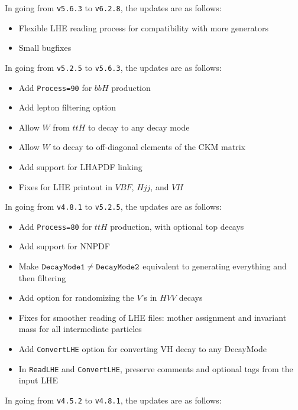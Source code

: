 \documentclass[aps,superscriptaddress,nofootinbib]{revtex4}
\begin{document}
\noindent
In going from \verb|v5.6.3| to \verb|v6.2.8|, the updates are as follows:

\begin{itemize}
\item Flexible LHE reading process for compatibility with more generators
\item Small bugfixes
\end{itemize}

\noindent
In going from \verb|v5.2.5| to \verb|v5.6.3|, the updates are as follows:

\begin{itemize}
\item Add \verb|Process=90| for $bbH$ production
\item Add lepton filtering option
\item Allow $W$ from $ttH$ to decay to any decay mode
\item Allow $W$ to decay to off-diagonal elements of the CKM matrix
\item Add support for LHAPDF linking
\item Fixes for LHE printout in $VBF$, $Hjj$, and $VH$
\end{itemize}

\noindent
In going from \verb|v4.8.1| to \verb|v5.2.5|, the updates are as follows:

\begin{itemize}
\item Add \verb|Process=80| for $ttH$ production, with optional top decays
\item Add support for NNPDF
\item Make $\verb|DecayMode1|\ne\verb|DecayMode2|$ equivalent to generating everything and then filtering
\item Add option for randomizing the $V$'s in $HVV$ decays
\item Fixes for smoother reading of LHE files: mother assignment and invariant mass for all intermediate particles
\item Add \verb|ConvertLHE| option for converting VH decay to any DecayMode
\item In \verb|ReadLHE| and \verb|ConvertLHE|, preserve comments and optional tags from the input LHE
\end{itemize}

\noindent
In going from \verb|v4.5.2| to \verb|v4.8.1|, the updates are as follows:
\end{document}
